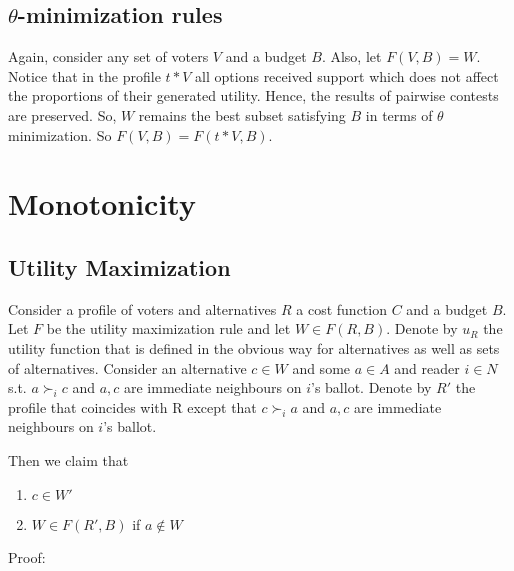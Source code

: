 \documentclass{article}
\begin{document}
\subsection{$\theta$-minimization rules}
Again, consider any set of voters $V$ and a budget $B$. Also, let $F(V, B) = W$. Notice that in the profile $t*V$ all options received support which does not affect the proportions of their generated utility. Hence, the results of pairwise contests are preserved. So, $W$ remains the best subset satisfying $B$ in terms of $\theta$ minimization. So $F(V, B) = F(t*V, B)$.

\section{Monotonicity}

\subsection{Utility Maximization}

Consider a profile of voters and alternatives $R$ a cost function $C$ and a budget $B$. Let $F$ be the utility maximization rule and let $W\in F(R,B)$. Denote by $u_R$ the utility function that is defined in the obvious way for alternatives as well as sets of alternatives. Consider an alternative $c\in W$ and some $a\in A$ and reader $i\in N$  s.t. $a\succ_i c$ and $a,c$ are immediate neighbours on $i$'s ballot. Denote by $R'$ the profile that coincides with R except that $c\succ_i a$ and $a,c$ are immediate neighbours on $i$'s ballot.

Then we claim that
\begin{enumerate}
\item $c\in W'$
\item $W\in F(R',B)$ if $a\notin W$
\end{enumerate}
Proof:
\end{document}

